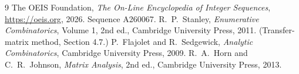 \documentclass[11pt,a4paper]{article}
\theoremstyle{plain}
\theoremstyle{definition}
\begin{document}
\begin{thebibliography}{9}
 The OEIS Foundation, \emph{The On-Line Encyclopedia of Integer
Sequences}, \url{https://oeis.org}, 2026. Sequence A260067.
 R.~P.~Stanley, \emph{Enumerative Combinatorics}, Volume 1, 2nd ed.,
Cambridge University Press, 2011. (Transfer-matrix method, Section 4.7.)
 P.~Flajolet and R.~Sedgewick, \emph{Analytic Combinatorics}, Cambridge
University Press, 2009.
 R.~A.~Horn and C.~R.~Johnson, \emph{Matrix Analysis}, 2nd ed., Cambridge
University Press, 2013.
\end{thebibliography}
\end{document}
